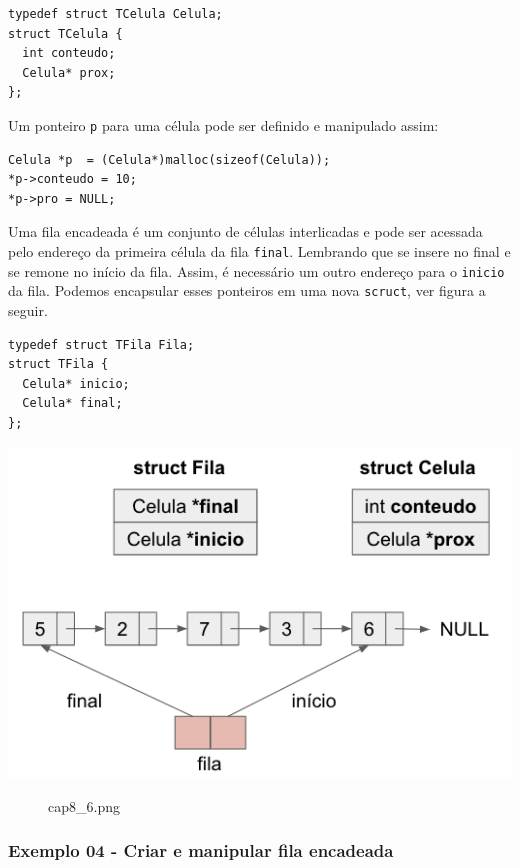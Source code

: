 \documentclass[12pt,a4paper]{article}
\begin{document}
\begin{verbatim}
typedef struct TCelula Celula;
struct TCelula {
  int conteudo;
  Celula* prox;
};
\end{verbatim}

Um ponteiro \texttt{p} para uma célula pode ser definido e manipulado
assim:

\begin{verbatim}
Celula *p  = (Celula*)malloc(sizeof(Celula));
*p->conteudo = 10;
*p->pro = NULL;
\end{verbatim}

Uma fila encadeada é um conjunto de células interlicadas e pode ser
acessada pelo endereço da primeira célula da fila \texttt{final}.
Lembrando que se insere no final e se remone no início da fila. Assim, é
necessário um outro endereço para o \texttt{inicio} da fila. Podemos
encapsular esses ponteiros em uma nova \texttt{scruct}, ver figura a
seguir.

    \begin{verbatim}
typedef struct TFila Fila;
struct TFila {
  Celula* inicio;
  Celula* final;
};
\end{verbatim}

\includegraphics{"figs/cap8_6.png"}

    \begin{figure}
\centering
\caption{cap8\_6.png}
\end{figure}

    \hypertarget{exemplo-04---criar-e-manipular-fila-encadeada}{%
\subsubsection{Exemplo 04 - Criar e manipular fila
encadeada}\label{exemplo-04---criar-e-manipular-fila-encadeada}}
\end{document}
